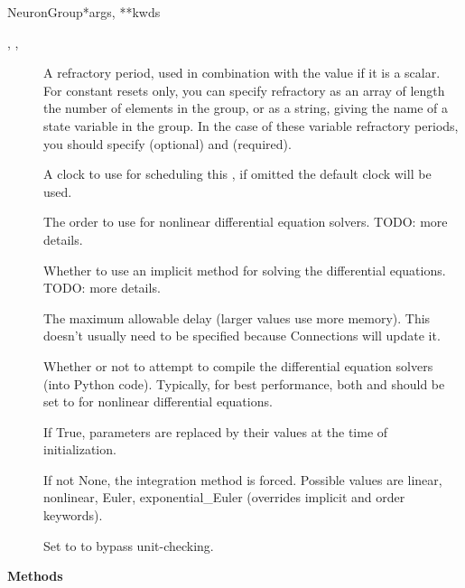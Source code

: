 \documentclass[letterpaper,10pt,english]{manual}
\begin{document}
\begin{classdesc}{NeuronGroup}{*args, **kwds}
\begin{description}
\item[, , ] \leavevmode
A refractory period, used in combination with the  value
if it is a scalar. For constant resets only, you can specify refractory
as an array of length the number of elements in the group, or as a
string, giving the name of a state variable in the group. In the case
of these variable refractory periods, you should specify
 (optional) and  (required).

\item[] \leavevmode
A clock to use for scheduling this \hyperlink{brian.NeuronGroup}{}, if omitted the
default clock will be used.

\item[] \leavevmode
The order to use for nonlinear differential equation solvers.
TODO: more details.

\item[] \leavevmode
Whether to use an implicit method for solving the differential
equations. TODO: more details.

\item[] \leavevmode
The maximum allowable delay (larger values use more memory).
This doesn't usually need to be specified because Connections will update it.

\item[] \leavevmode
Whether or not to attempt to compile the differential equation
solvers (into Python code). Typically, for best performance, both 
and  should be set to  for nonlinear differential equations.

\item[] \leavevmode
If True, parameters are replaced by their values at the time
of initialization.

\item[] \leavevmode
If not None, the integration method is forced. Possible values are
linear, nonlinear, Euler, exponential\_Euler (overrides implicit and order
keywords).

\item[] \leavevmode
Set to  to bypass unit-checking.

\end{description}

\textbf{Methods}


\end{classdesc}
\end{document}
